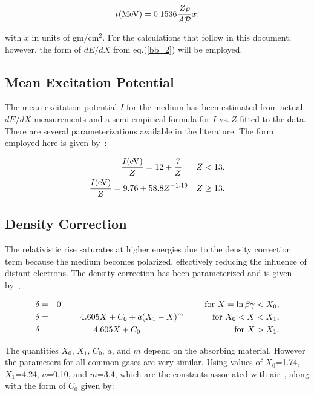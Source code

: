\documentclass[12pt]{article}
\begin{document}
\begin{equation}
t ({\rm MeV}) = 0.1536 \frac{Z \rho}{A \cal{P}} x,
\end{equation}

\noindent
with $x$ in units of gm/cm$^2$.  
For the calculations that follow in this document, however, the form of $dE/dX$ from eq.(\ref{bb_2}) will be employed.

\subsection{Mean Excitation Potential}

The mean excitation potential $I$ for the medium has been estimated from actual $dE/dX$ measurements and a semi-empirical formula for $I$ vs.$\:Z$ fitted to the data.  
There are several parameterizations available in the literature.  The form employed here is given by~\cite{leo}:

\begin{eqnarray}
\frac{I ({\rm eV})}{Z} = 12 + \frac{7}{Z} ~~~~~Z < 13, \nonumber \\
\frac{I ({\rm eV})}{Z} = 9.76 + 58.8 Z^{-1.19} ~~~Z \ge 13.
\end{eqnarray}

\subsection{Density Correction}

The relativistic rise saturates at higher energies due to the density correction term because the medium becomes polarized, effectively reducing the influence of distant
electrons.  The density correction has been parameterized and is given by~\cite{stern},

\begin{eqnarray}
\delta &=& 0 \hskip 6.0cm {\rm for}~X = \ln \beta \gamma < X_0, \nonumber \\
\delta &=& 4.605 X + C_0 + a(X_1 - X)^m \hskip 1.20cm {\rm for}~ X_0 < X < X_1, \nonumber \\
\delta &=& 4.605 X + C_0 \hskip 3.92cm {\rm for}~X > X_1.
\end{eqnarray}

\noindent
The quantities $X_0$, $X_1$, $C_0$, $a$, and $m$ depend on the absorbing material.  However the parameters for all common gases are very similar. 
Using values of $X_0$=1.74, $X_1$=4.24, $a$=0.10, and $m$=3.4, which are the constants associated with air~\cite{leo}, along with the form of $C_0$ given by:
\end{document}
